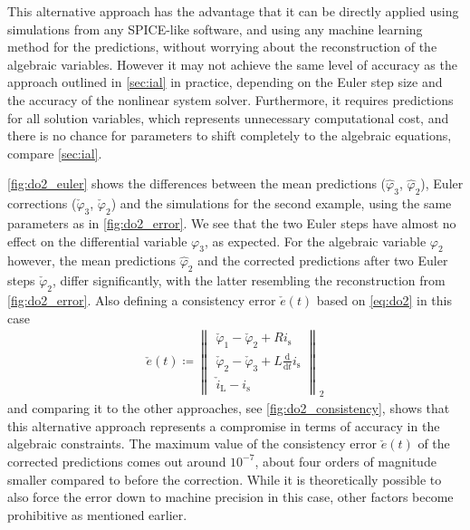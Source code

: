 \documentclass[AMA,STIX1COL]{WileyNJD-v2}
\newcommand{\mr}[1]{\mathrm{#1}}
\newcommand{\ddt}{\frac{\mathrm{d}}{\mathrm{d}t}}
\begin{document}
This alternative approach has the advantage that it can be directly applied using simulations from any SPICE-like software, and using any machine learning method for the predictions, without worrying about the reconstruction of the algebraic variables. However it may not achieve the same level of accuracy as the approach outlined in \autoref{sec:ial} in practice, depending on the Euler step size and the accuracy of the nonlinear system solver\cite{garcia2022}. Furthermore, it requires predictions for all solution variables, which represents unnecessary computational cost, and there is no chance for parameters to shift completely to the algebraic equations, compare \autoref{sec:ial}.

\autoref{fig:do2_euler} shows the differences between the mean predictions ($\hat{\varphi}_3$, $\hat{\varphi}_2$), Euler corrections ($\check{\varphi}_3$, $\check{\varphi}_2$) and the simulations for the second example, using the same parameters as in \autoref{fig:do2_error}. We see that the two Euler steps have almost no effect on the differential variable $\varphi_3$, as expected. For the algebraic variable $\varphi_2$ however, the mean predictions $\hat{\varphi}_2$ and the corrected predictions after two Euler steps $\check{\varphi}_2$, differ significantly, with the latter resembling the reconstruction from \autoref{fig:do2_error}. Also defining a consistency error $\check{e}(t)$ based on \eqref{eq:do2} in this case
\begin{align*}
    \check{e}(t) \coloneqq \begin{Vmatrix}
        \check{\varphi}_1 - \check{\varphi}_2 + R i_\mr{s}\\
        \check{\varphi}_2 - \check{\varphi}_3 + L \ddt i_\mr{s}\\
        \check{i}_\mr{L} - i_\mr{s}
    \end{Vmatrix}_2
\end{align*}
and comparing it to the other approaches, see \autoref{fig:do2_consistency}, shows that this alternative approach represents a compromise in terms of accuracy in the algebraic constraints. The maximum value of the consistency error $\check{e}(t)$ of the corrected predictions comes out around $10^{-7}$, about four orders of magnitude smaller compared to before the correction. While it is theoretically possible to also force the error down to machine precision in this case, other factors become prohibitive as mentioned earlier.
\end{document}
